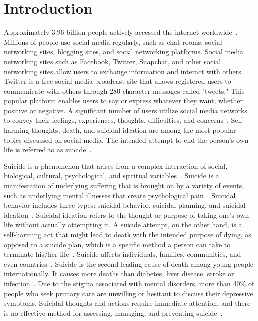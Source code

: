 \documentclass[sn-mathphys,Numbered]{sn-jnl}%
\begin{document}
\section{Introduction}

Approximately $3.96$ billion people actively accessed the internet worldwide~\cite{1astoveza2018suicidal}. Millions of people use social media regularly, such as chat rooms, social networking sites, blogging sites, and social networking platforms. Social media networking sites such as Facebook, Twitter, Snapchat, and other social networking sites allow users to exchange information and interact with others. Twitter is a free social media broadcast site that allows registered users to communicate with others through 280-character messages called "tweets." This popular platform enables users to say or express whatever they want, whether positive or negative. A significant number of users utilize social media networks to convey their feelings, experiences, thoughts, difficulties, and concerns~\cite{15n10.1145/2858036.2858207}. Self-harming thoughts, death, and suicidal ideation are among the most popular topics discussed on social media. The intended attempt to end the person's own life is referred to as suicide~\cite{2nock2008suicide}. 

Suicide is a phenomenon that arises from a complex interaction of social, biological, cultural, psychological, and spiritual variables~\cite{3beck1979assessment}. Suicide is a manifestation of underlying suffering that is brought on by a variety of events, such as underlying mental illnesses that create psychological pain~\cite{4liu2020suicidal}. Suicidal behavior includes three types: suicidal behavior, suicidal planning, and suicidal ideation~\cite{2nock2008suicide,3beck1979assessment,4liu2020suicidal}. Suicidal ideation refers to the thought or purpose of taking one's own life without actually attempting it. A suicide attempt, on the other hand, is a self-harming act that might lead to death with the intended purpose of dying, as opposed to a suicide plan, which is a specific method a person can take to terminate his/her life~\cite{2nock2008suicide,3beck1979assessment,4liu2020suicidal}. Suicide affects individuals, families, communities, and even countries~\cite{4liu2020suicidal}. Suicide is the second leading cause of death among young people internationally. It causes more deaths than diabetes, liver disease, stroke or infection~\cite{5weber2017psychiatric}. Due to the stigma associated with mental disorders, more than 40\% of people who seek primary care are unwilling or hesitant to discuss their depressive symptoms. Suicidal thoughts and actions require immediate attention, and there is no effective method for assessing, managing, and preventing suicide~\cite{5weber2017psychiatric}.
\end{document}
